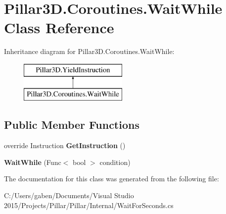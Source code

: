 \hypertarget{class_pillar3_d_1_1_coroutines_1_1_wait_while}{}\section{Pillar3\+D.\+Coroutines.\+Wait\+While Class Reference}
\label{class_pillar3_d_1_1_coroutines_1_1_wait_while}
Inheritance diagram for Pillar3\+D.\+Coroutines.\+Wait\+While\+:\begin{figure}[H]
\begin{center}
\leavevmode
\includegraphics[height=2.000000cm]{class_pillar3_d_1_1_coroutines_1_1_wait_while}
\end{center}
\end{figure}
\subsection*{Public Member Functions}
\begin{DoxyCompactItemize}
\item 
\mbox{\label{class_pillar3_d_1_1_coroutines_1_1_wait_while_a6c9bb5a9f850d252bc0b023f5f5e73cf}} 
override Instruction {\bfseries Get\+Instruction} ()
\item 
\mbox{\label{class_pillar3_d_1_1_coroutines_1_1_wait_while_a15f4bc0de915f36a57f6dff0f64e0d49}} 
{\bfseries Wait\+While} (Func$<$ bool $>$ condition)
\end{DoxyCompactItemize}


The documentation for this class was generated from the following file\+:\begin{DoxyCompactItemize}
\item 
C\+:/\+Users/gaben/\+Documents/\+Visual Studio 2015/\+Projects/\+Pillar/\+Pillar/\+Internal/Wait\+For\+Seconds.\+cs\end{DoxyCompactItemize}
